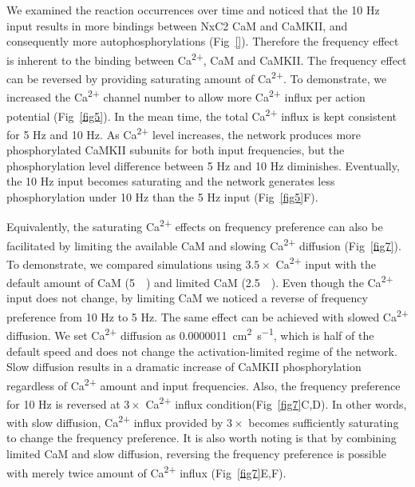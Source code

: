 \documentclass[10pt,letterpaper]{article}
\begin{document}
We examined the reaction occurrences over time and noticed that the 10 Hz input results in more bindings between NxC2 CaM and CaMKII, and consequently more autophosphorylations (Fig~\ref{}). Therefore the frequency effect is inherent to the binding between Ca\textsuperscript{2+}, CaM and CaMKII. The frequency effect can be reversed by providing saturating amount of Ca\textsuperscript{2+}. To demonstrate, we increased the Ca\textsuperscript{2+} channel number to allow more Ca\textsuperscript{2+} influx per action potential (Fig~\ref{fig5}). In the mean time, the total Ca\textsuperscript{2+} influx is kept consistent for 5 Hz and 10 Hz. As Ca\textsuperscript{2+} level increases, the network produces more phosphorylated CaMKII subunits for both input frequencies, but the phosphorylation level difference between 5 Hz and 10 Hz diminishes. Eventually, the 10 Hz input becomes saturating and the network generates less phosphorylation under 10 Hz than the 5 Hz input (Fig~\ref{fig5}F).

Equivalently, the saturating Ca\textsuperscript{2+} effects on frequency preference can also be facilitated by limiting the available CaM and slowing Ca\textsuperscript{2+} diffusion (Fig~\ref{fig7}). To demonstrate, we compared simulations using $3.5\times$ Ca\textsuperscript{2+} input with the default amount of CaM (\SI{5}{\micro\Molar}) and limited CaM (\SI{2.5}{\micro\Molar}). Even though the Ca\textsuperscript{2+} input does not change, by limiting CaM we noticed a reverse of frequency preference from 10 Hz to 5 Hz. The same effect can be achieved with slowed Ca\textsuperscript{2+} diffusion. We set Ca\textsuperscript{2+} diffusion as \SI{0.0000011}{\square\cm\per\s}, which is half of the default speed and does not change the activation-limited regime of the network. Slow diffusion results in a dramatic increase of CaMKII phosphorylation regardless of Ca\textsuperscript{2+} amount and input frequencies. Also, the frequency preference for 10 Hz is reversed at $3\times$ Ca\textsuperscript{2+} influx condition(Fig~\ref{fig7}C,D). In other words, with slow diffusion, Ca\textsuperscript{2+} influx provided by $3\times$ becomes sufficiently saturating to change the frequency preference. It is also worth noting is that by combining limited CaM and slow diffusion, reversing the frequency preference is possible with merely twice amount of Ca\textsuperscript{2+} influx (Fig~\ref{fig7}E,F). 
\end{document}
